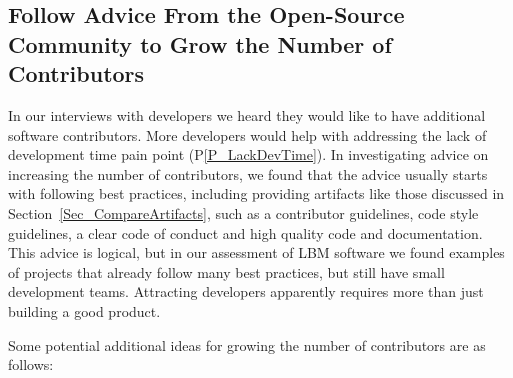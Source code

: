 \documentclass[final, 3p, times, authoryear]{elsarticle}
\newcommand{\ppref}[1]{P\ref{#1}}
\begin{document}
\subsection{Follow Advice From the Open-Source Community to Grow the Number of Contributors} \label{Sec_GrowContributors}

In our interviews with developers we heard they would like to have additional
software contributors.  More developers would help with addressing the lack of
development time pain point (\ppref{P_LackDevTime}).  In investigating advice on
increasing the number of contributors, we found that the advice usually starts
with following best practices, including providing artifacts like those
discussed in Section~\ref{Sec_CompareArtifacts}, such as a contributor
guidelines, code style guidelines, a clear code of conduct and high quality code
and documentation. This advice is logical, but in our assessment of LBM software
we found examples of projects that already follow many best practices, but still
have small development teams. Attracting developers apparently requires more
than just building a good product.

Some potential additional ideas for growing the number of contributors are
as follows:
\end{document}
